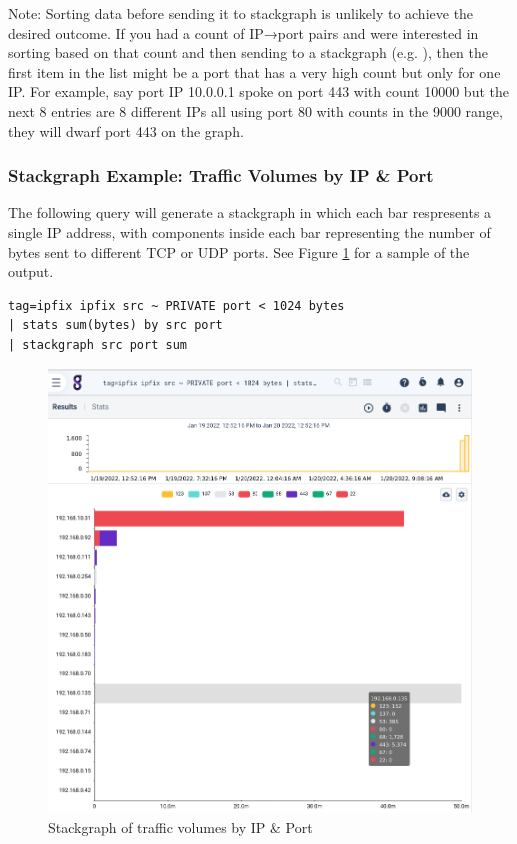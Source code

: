 Note: Sorting data before sending it to stackgraph is unlikely to
achieve the desired outcome. If you had a count of IP→port pairs
and were interested in sorting based on that count and then sending to a
stackgraph (e.g. ), then the first item in the
list might be a port that has a very high count but only for one IP. For
example, say port IP 10.0.0.1 spoke on port 443 with count 10000 but the
next 8 entries are 8 different IPs all using port 80 with counts in the
9000 range, they will dwarf port 443 on the graph.

\subsubsection{Stackgraph Example: Traffic Volumes by IP \& Port}

The following query will generate a stackgraph in which each bar respresents
a single IP address, with components inside each bar representing the number
of bytes sent to different TCP or UDP ports. See Figure \ref{fig:stackgraph-traffic}
for a sample of the output.

\begin{Verbatim}[breaklines=true]
tag=ipfix ipfix src ~ PRIVATE port < 1024 bytes 
| stats sum(bytes) by src port 
| stackgraph src port sum
\end{Verbatim}

\begin{figure}
	\includegraphics[width=0.6\linewidth]{images/stackgraph-traffic.png}
	\caption{Stackgraph of traffic volumes by IP \& Port}
	\label{fig:stackgraph-traffic}
\end{figure}

